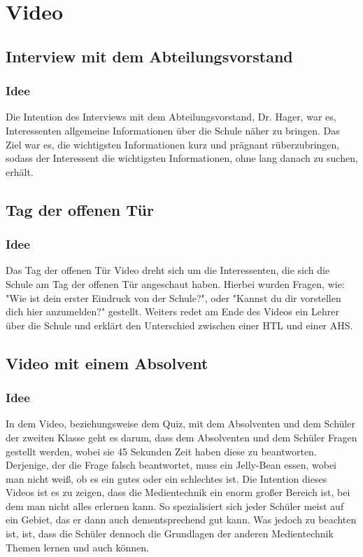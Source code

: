\chapter{Video}
\renewcommand{\kapitelautor}{Autor: Kerstin Schön}
\section{Interview mit dem Abteilungsvorstand}
\subsection{Idee}
Die Intention des Interviews mit dem Abteilungsvorstand, Dr. Hager, war es, Interessenten allgemeine Informationen über die Schule näher zu bringen. Das Ziel war es, die wichtigsten Informationen kurz und prägnant rüberzubringen, sodass der Interessent die wichtigsten Informationen, ohne lang danach zu suchen, erhält.
\section{Tag der offenen Tür}
\subsection{Idee}
Das Tag der offenen Tür Video dreht sich um die Interessenten, die sich die Schule am Tag der offenen Tür angeschaut haben. Hierbei wurden Fragen, wie: "Wie ist dein erster Eindruck von der Schule?", oder "Kannst du dir vorstellen dich hier anzumelden?" gestellt. Weiters redet am Ende des Videos ein Lehrer über die Schule und erklärt den Unterschied zwischen einer HTL und einer AHS.
\section{Video mit einem Absolvent}
\subsection{Idee}
In dem Video, beziehungsweise dem Quiz, mit dem Absolventen und dem Schüler der zweiten Klasse geht es darum, dass dem Absolventen und dem Schüler Fragen gestellt werden, wobei sie 45 Sekunden Zeit haben diese zu beantworten. Derjenige, der die Frage falsch beantwortet, muss ein Jelly-Bean essen, wobei man nicht weiß, ob es ein gutes oder ein schlechtes ist. Die Intention dieses Videos ist es zu zeigen, dass die Medientechnik ein enorm großer Bereich ist, bei dem man nicht alles erlernen kann. So spezialisiert sich jeder Schüler meist auf ein Gebiet, das er dann auch dementsprechend gut kann. Was jedoch zu beachten ist, ist, dass die Schüler dennoch die Grundlagen der anderen Medientechnik Themen lernen und auch können.